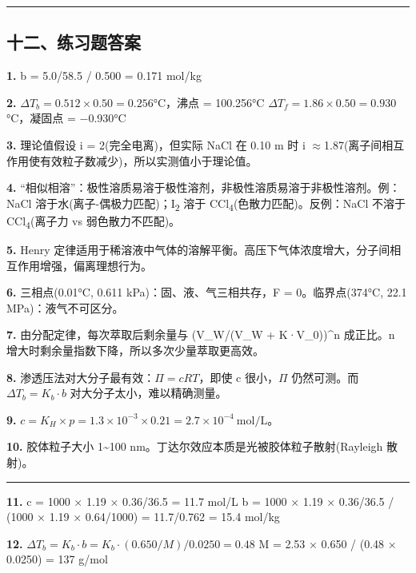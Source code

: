 \documentclass[a4paper,11pt]{ctexart}
\newcommand{\箭}{\ensuremath{\rightarrow}}
\newcommand{\左箭}{\ensuremath{\leftarrow}}
\newcommand{\上箭}{\ensuremath{\uparrow}}
\newcommand{\下箭}{\ensuremath{\downarrow}}
\newcommand{\衡}{\ensuremath{\rightleftharpoons}}
\newcommand{\双箭}{\ensuremath{\leftrightarrow}}
\newcommand{\约等于}{\ensuremath{\approx}}
\newcommand{\小于等于}{\ensuremath{\leq}}
\newcommand{\大于等于}{\ensuremath{\geq}}
\newcommand{\不等于}{\ensuremath{\neq}}
\newcommand{\西格马}{\ensuremath{\sigma}}
\newcommand{\派}{\ensuremath{\pi}}
\begin{document}
\begin{center}\rule{0.5\linewidth}{0.5pt}\end{center}

\subsection{十二、练习题答案}\label{ux5341ux4e8cux7ec3ux4e60ux9898ux7b54ux6848}

\textbf{1.} b = 5.0/58.5 / 0.500 = 0.171 mol/kg

\textbf{2.} \(\Delta T_b = 0.512 \times 0.50 = 0.256\)°C，沸点 = 100.256°C
\(\Delta T_f = 1.86 \times 0.50 = 0.930\)°C，凝固点 = −0.930°C

\textbf{3.} 理论值假设 i = 2(完全电离)，但实际 NaCl 在 0.10 m 时 i \约等于 1.87(离子间相互作用使有效粒子数减少)，所以实测值小于理论值。

\textbf{4.} ``相似相溶''：极性溶质易溶于极性溶剂，非极性溶质易溶于非极性溶剂。例：NaCl 溶于水(离子-偶极力匹配)；I\textsubscript{2} 溶于 CCl\textsubscript{4}(色散力匹配)。反例：NaCl 不溶于 CCl\textsubscript{4}(离子力 vs 弱色散力不匹配)。

\textbf{5.} Henry 定律适用于稀溶液中气体的溶解平衡。高压下气体浓度增大，分子间相互作用增强，偏离理想行为。

\textbf{6.} 三相点(0.01°C, 0.611 kPa)：固、液、气三相共存，F = 0。临界点(374°C, 22.1 MPa)：液气不可区分。

\textbf{7.} 由分配定律，每次萃取后剩余量与 (V\_W/(V\_W + K·V\_0))\^{}n 成正比。n 增大时剩余量指数下降，所以多次少量萃取更高效。

\textbf{8.} 渗透压法对大分子最有效：\(\Pi = cRT\)，即使 c 很小，\(\Pi\) 仍然可测。而 \(\Delta T_b = K_b \cdot b\) 对大分子太小，难以精确测量。

\textbf{9.} \(c = K_H \times p = 1.3 \times 10^{-3} \times 0.21 = 2.7 \times 10^{-4}\ \mathrm{mol/L}\)。

\textbf{10.} 胶体粒子大小 1\textasciitilde100 nm。丁达尔效应本质是光被胶体粒子散射(Rayleigh 散射)。

\begin{center}\rule{0.5\linewidth}{0.5pt}\end{center}

\textbf{11.} c = 1000 × 1.19 × 0.36/36.5 = 11.7 mol/L
b = 1000 × 1.19 × 0.36/36.5 / (1000 × 1.19 × 0.64/1000) = 11.7/0.762 = 15.4 mol/kg

\textbf{12.} \(\Delta T_b = K_b \cdot b = K_b \cdot (0.650/M) / 0.0250 = 0.48\)
M = 2.53 × 0.650 / (0.48 × 0.0250) = 137 g/mol
\end{document}
